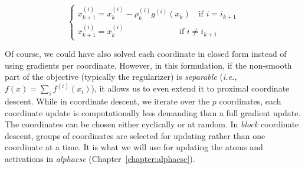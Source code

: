 \begin{equation}
\begin{cases}
x^{(i)}_{k+1} = x^{(i)}_{k} - \rho^{(i)}_k g^{(i)}(x_k) \quad \text{if } i=i_{k+1}\\
x^{(i)}_{k+1} = x^{(i)}_{k} \hspace{80pt} \text{if } i \neq i_{k+1}
\end{cases}
\end{equation}

Of course, we could have also solved each coordinate in closed form instead of using gradients per coordinate. However, in this formulation, if the non-smooth part of the objective (typically the regularizer) is \emph{separable} (\textit{i.e.,} $f(x) = \sum_i f^{(i)}(x_i)$), it allows us to even extend it to proximal coordinate descent. While in coordinate descent, we iterate over the $p$ coordinates, each coordinate update is computationally less demanding than a full gradient update. The coordinates can be chosen either cyclically or at random. In \emph{block} coordinate descent, groups of coordinates are selected for updating rather than one coordinate at a time. It is what we will use for updating the atoms and activations in \emph{alphacsc} (Chapter~\ref{chapter:alphacsc}).

